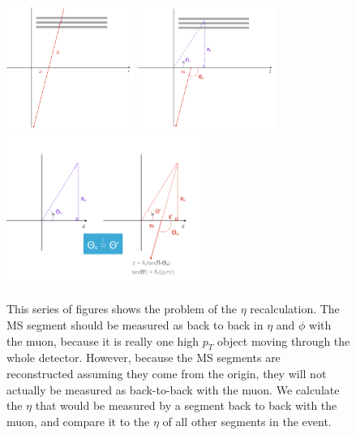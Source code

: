 \begin{figure}[htbp]
\centering
\includegraphics[height=4cm]{figures/cosmics/eta_correction_1.png}
\includegraphics[height=4cm]{figures/cosmics/eta_correction_2.png}
\includegraphics[height=5cm]{figures/cosmics/eta_correction_3.png}
\caption{This series of figures shows the problem of the $\eta$ recalculation. The MS segment should be measured as back to back in $\eta$ and $\phi$ with the muon, because it is really one high $p_{T}$ object moving through the whole detector. However, because the MS segments are reconstructed assuming they come from the origin, they will not actually be measured as back-to-back with the muon. We calculate the $\eta$ that would be measured by a segment back to back with the muon, and compare it to the $\eta$ of all other segments in the event.}
\label{fig:cos_eta_recalculation}
\end{figure}

